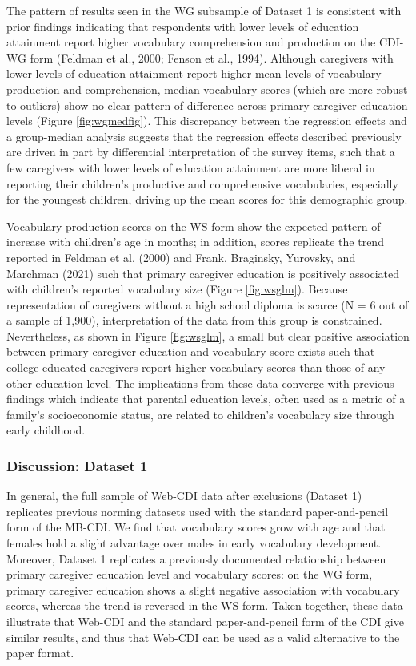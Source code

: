 \documentclass[
  english,
  ,man,floatsintext]{apa6}
\begin{document}
The pattern of results seen in the WG subsample of Dataset 1 is consistent with prior findings indicating that respondents with lower levels of education attainment report higher vocabulary comprehension and production on the CDI-WG form (Feldman et al., 2000; Fenson et al., 1994). Although caregivers with lower levels of education attainment report higher mean levels of vocabulary production and comprehension, median vocabulary scores (which are more robust to outliers) show no clear pattern of difference across primary caregiver education levels (Figure \ref{fig:wgmedfig}). This discrepancy between the regression effects and a group-median analysis suggests that the regression effects described previously are driven in part by differential interpretation of the survey items, such that a few caregivers with lower levels of education attainment are more liberal in reporting their children's productive and comprehensive vocabularies, especially for the youngest children, driving up the mean scores for this demographic group.

Vocabulary production scores on the WS form show the expected pattern of increase with children's age in months; in addition, scores replicate the trend reported in Feldman et al. (2000) and Frank, Braginsky, Yurovsky, and Marchman (2021) such that primary caregiver education is positively associated with children's reported vocabulary size (Figure \ref{fig:wsglm}). Because representation of caregivers without a high school diploma is scarce (N = 6 out of a sample of 1,900), interpretation of the data from this group is constrained. Nevertheless, as shown in Figure \ref{fig:wsglm}, a small but clear positive association between primary caregiver education and vocabulary score exists such that college-educated caregivers report higher vocabulary scores than those of any other education level. The implications from these data converge with previous findings which indicate that parental education levels, often used as a metric of a family's socioeconomic status, are related to children's vocabulary size through early childhood.

\hypertarget{discussion-dataset-1}{%
\subsubsection{Discussion: Dataset 1}\label{discussion-dataset-1}}

In general, the full sample of Web-CDI data after exclusions (Dataset 1) replicates previous norming datasets used with the standard paper-and-pencil form of the MB-CDI. We find that vocabulary scores grow with age and that females hold a slight advantage over males in early vocabulary development. Moreover, Dataset 1 replicates a previously documented relationship between primary caregiver education level and vocabulary scores: on the WG form, primary caregiver education shows a slight negative association with vocabulary scores, whereas the trend is reversed in the WS form. Taken together, these data illustrate that Web-CDI and the standard paper-and-pencil form of the CDI give similar results, and thus that Web-CDI can be used as a valid alternative to the paper format.
\end{document}
